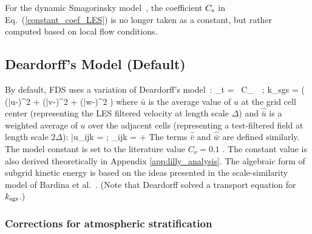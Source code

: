 For the dynamic Smagorinsky model~\cite{Germano:1,Moin:1991}, the coefficient $C_{\rm s}$ in Eq.~(\ref{constant_coef_LES}) is no longer taken as a constant, but rather computed based on local flow conditions.

\subsection{Deardorff's Model (Default)}
\label{sec:deardorff}

By default, FDS uses a variation of Deardorff's model~\cite{Deardorff:1980}:
\be
  \mu_{\rm t} = \rho \, C_\nu \, \Delta \,  \quad ; \quad
  k_{\rm sgs} = \ha \left( (\bar{u}-)^2 + (\bar{v}-)^2 + (\bar{w}-)^2 \right)  \label{Deardorff_LES}
\ee
where $\bar{u}$ is the average value of $u$ at the grid cell center (representing the LES filtered velocity at length scale $\Delta$) and $\hat{\bar{u}}$ is a weighted average of $u$ over the adjacent cells (representing a test-filtered field at length scale $2\Delta$):
\be
   \bar{u}_{ijk} =  \quad ; \quad {}_{ijk} =  + 
\ee
The terms $\hat{\bar{v}}$ and $\hat{\bar{w}}$ are defined similarly.  The model constant is set to the literature value $C_\nu=0.1$ \cite{Pope:2000}.  The constant value is also derived theoretically in Appendix \ref{app:lilly_analysis}.  The algebraic form of subgrid kinetic energy is based on the ideas presented in the scale-similarity model of Bardina et al.~\cite{Bardina:1980}. (Note that Deardorff \cite{Deardorff:1980} solved a transport equation for $k_{\rm sgs}$.)

\subsubsection*{Corrections for atmospheric stratification}
\label{sec:potential_temp_correction}

